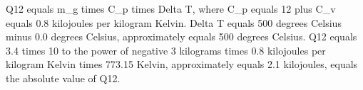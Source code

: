 Q12 equals m_g times C_p times Delta T, where C_p equals 12 plus C_v equals 0.8 kilojoules per kilogram Kelvin. Delta T equals 500 degrees Celsius minus 0.0 degrees Celsius, approximately equals 500 degrees Celsius. Q12 equals 3.4 times 10 to the power of negative 3 kilograms times 0.8 kilojoules per kilogram Kelvin times 773.15 Kelvin, approximately equals 2.1 kilojoules, equals the absolute value of Q12.